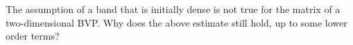   The assumption of a band that is initially dense is not true for the
  matrix of a two-dimensional \ac{BVP}. Why does the above estimate
  still hold, up to some lower order terms?
